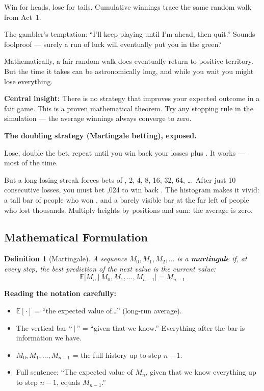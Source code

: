 \documentclass[12pt, a4paper]{article}
\newtheorem{definition}{Definition}
\newcommand{\E}{\mathbb{E}}            %
\newcommand{\given}{\,\vert\,}         %
\begin{document}
\begin{intuition}
Win  for heads, lose  for tails.  Cumulative winnings
trace the same random walk from Act~1.

The gambler's temptation: ``I'll keep playing until I'm ahead, then quit.''
Sounds foolproof --- surely a run of luck will eventually put you in the green?

Mathematically, a fair random walk does eventually return to positive territory.
But the time it takes can be astronomically long, and while you wait you might
lose everything.

\textbf{Central insight:} There is no strategy that improves your expected
outcome in a fair game.  This is a proven mathematical theorem.  Try any
stopping rule in the simulation --- the average winnings always converge to
zero.
\end{intuition}

\begin{intuition}
\textbf{The doubling strategy (Martingale betting), exposed.}

Lose, double the bet, repeat until you win back your losses plus .
It works --- most of the time.

But a long losing streak forces bets of
, 2, 4, 8, 16, 32, 64, \ldots\
After just 10 consecutive losses, you must bet ,024 to win back
.  The histogram makes it vivid: a tall bar of people who won
\texteuro1, and a barely visible bar at the far left of people who lost
thousands.  Multiply heights by positions and sum: the average is zero.
\end{intuition}

\subsection{Mathematical Formulation}

\begin{definition}[Martingale]
A sequence $M_0, M_1, M_2, \ldots$ is a \textbf{martingale} if, at every
step, the best prediction of the next value is the current value:
\[
  \boxed{\E\bigl[M_n \given M_0, M_1, \ldots, M_{n-1}\bigr] = M_{n-1}}
\]
\end{definition}

\textbf{Reading the notation carefully:}
\begin{itemize}[nosep]
  \item $\E[\cdot]$ = ``the expected value of\ldots'' (long-run average).
  \item The vertical bar ``$\given$'' = ``given that we know.''
        Everything after the bar is information we have.
  \item $M_0, M_1, \ldots, M_{n-1}$ = the full history up to step $n-1$.
  \item Full sentence: ``The expected value of $M_n$, given that we know
        everything up to step $n-1$, equals $M_{n-1}$.''
\end{itemize}
\end{document}
